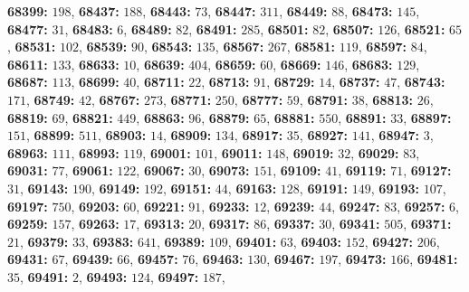 \textsf{\bfseries 68399:} $198$, \textsf{\bfseries 68437:} $188$, \textsf{\bfseries 68443:} $73$, \textsf{\bfseries 68447:} $311$, \textsf{\bfseries 68449:} $88$, \textsf{\bfseries 68473:} $145$, \textsf{\bfseries 68477:} $31$, \textsf{\bfseries 68483:} $6$, \textsf{\bfseries 68489:} $82$, \textsf{\bfseries 68491:} $285$, \textsf{\bfseries 68501:} $82$, \textsf{\bfseries 68507:} $126$, \textsf{\bfseries 68521:} $65$, \textsf{\bfseries 68531:} $102$, \textsf{\bfseries 68539:} $90$, \textsf{\bfseries 68543:} $135$, \textsf{\bfseries 68567:} $267$, \textsf{\bfseries 68581:} $119$, \textsf{\bfseries 68597:} $84$, \textsf{\bfseries 68611:} $133$, \textsf{\bfseries 68633:} $10$, \textsf{\bfseries 68639:} $404$, \textsf{\bfseries 68659:} $60$, \textsf{\bfseries 68669:} $146$, \textsf{\bfseries 68683:} $129$, \textsf{\bfseries 68687:} $113$, \textsf{\bfseries 68699:} $40$, \textsf{\bfseries 68711:} $22$, \textsf{\bfseries 68713:} $91$, \textsf{\bfseries 68729:} $14$, \textsf{\bfseries 68737:} $47$, \textsf{\bfseries 68743:} $171$, \textsf{\bfseries 68749:} $42$, \textsf{\bfseries 68767:} $273$, \textsf{\bfseries 68771:} $250$, \textsf{\bfseries 68777:} $59$, \textsf{\bfseries 68791:} $38$, \textsf{\bfseries 68813:} $26$, \textsf{\bfseries 68819:} $69$, \textsf{\bfseries 68821:} $449$, \textsf{\bfseries 68863:} $96$, \textsf{\bfseries 68879:} $65$, \textsf{\bfseries 68881:} $550$, \textsf{\bfseries 68891:} $33$, \textsf{\bfseries 68897:} $151$, \textsf{\bfseries 68899:} $511$, \textsf{\bfseries 68903:} $14$, \textsf{\bfseries 68909:} $134$, \textsf{\bfseries 68917:} $35$, \textsf{\bfseries 68927:} $141$, \textsf{\bfseries 68947:} $3$, \textsf{\bfseries 68963:} $111$, \textsf{\bfseries 68993:} $119$, \textsf{\bfseries 69001:} $101$, \textsf{\bfseries 69011:} $148$, \textsf{\bfseries 69019:} $32$, \textsf{\bfseries 69029:} $83$, \textsf{\bfseries 69031:} $77$, \textsf{\bfseries 69061:} $122$, \textsf{\bfseries 69067:} $30$, \textsf{\bfseries 69073:} $151$, \textsf{\bfseries 69109:} $41$, \textsf{\bfseries 69119:} $71$, \textsf{\bfseries 69127:} $31$, \textsf{\bfseries 69143:} $190$, \textsf{\bfseries 69149:} $192$, \textsf{\bfseries 69151:} $44$, \textsf{\bfseries 69163:} $128$, \textsf{\bfseries 69191:} $149$, \textsf{\bfseries 69193:} $107$, \textsf{\bfseries 69197:} $750$, \textsf{\bfseries 69203:} $60$, \textsf{\bfseries 69221:} $91$, \textsf{\bfseries 69233:} $12$, \textsf{\bfseries 69239:} $44$, \textsf{\bfseries 69247:} $83$, \textsf{\bfseries 69257:} $6$, \textsf{\bfseries 69259:} $157$, \textsf{\bfseries 69263:} $17$, \textsf{\bfseries 69313:} $20$, \textsf{\bfseries 69317:} $86$, \textsf{\bfseries 69337:} $30$, \textsf{\bfseries 69341:} $505$, \textsf{\bfseries 69371:} $21$, \textsf{\bfseries 69379:} $33$, \textsf{\bfseries 69383:} $641$, \textsf{\bfseries 69389:} $109$, \textsf{\bfseries 69401:} $63$, \textsf{\bfseries 69403:} $152$, \textsf{\bfseries 69427:} $206$, \textsf{\bfseries 69431:} $67$, \textsf{\bfseries 69439:} $66$, \textsf{\bfseries 69457:} $76$, \textsf{\bfseries 69463:} $130$, \textsf{\bfseries 69467:} $197$, \textsf{\bfseries 69473:} $166$, \textsf{\bfseries 69481:} $35$, \textsf{\bfseries 69491:} $2$, \textsf{\bfseries 69493:} $124$, \textsf{\bfseries 69497:} $187$, 
